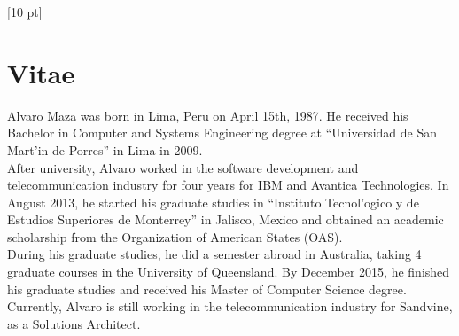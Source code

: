 \titleformat{\chapter}{\Huge\bfseries}{\thechapter}{0 pt}{\rule{340 pt}{3 pt}\\}
\titlespacing{\chapter}{100 pt}{-25 pt}{40 pt}[10 pt]	
\pagestyle{fancy}
\fancyhead[RO,RE]{\thepage}
\fancyfoot[CO,CE]{}

\chapter*{Vitae}

\normalsize
\noindent
Alvaro Maza was born in Lima, Peru on April 15th, 1987. He received his Bachelor in Computer and Systems Engineering degree at ``Universidad de San Mart'in de Porres'' in Lima in 2009.  \\

After university, Alvaro worked in the software development and telecommunication industry for four years for IBM and Avantica Technologies. In August 2013, he started his graduate studies in ``Instituto Tecnol'ogico y de Estudios Superiores de Monterrey'' in Jalisco, Mexico and obtained an academic scholarship from the Organization of American States (OAS). \\

During his graduate studies, he did a semester abroad in Australia, taking 4 graduate courses in the University of Queensland. By December 2015, he finished his graduate studies and received his Master of Computer Science degree. \\

Currently, Alvaro is still working in the telecommunication industry for Sandvine, as a Solutions Architect. 

